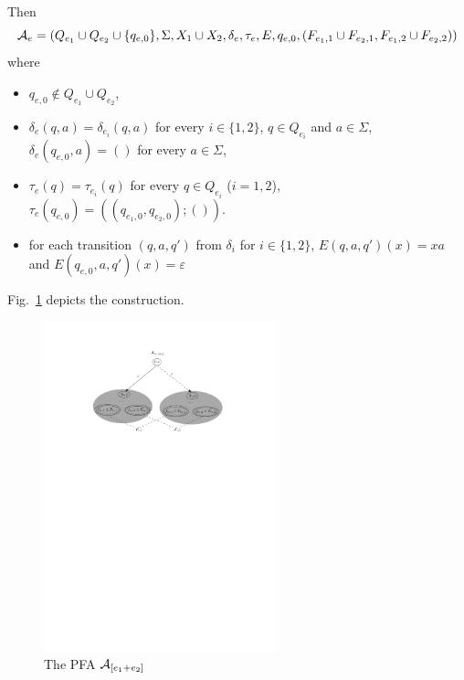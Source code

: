 Then 
\[\mathcal{A}_e = (Q_{e_1} \cup Q_{e_2} \cup \{q_{e,0}\}, \Sigma, X_1\cup X_2, 
		\delta_e, \tau_e, E, q_{e,0}, (F_{e_1,1} \cup F_{e_2,1}, F_{e_1,2} \cup F_{e_2,2}))\] where  
		\begin{itemize}
			\item $q_{e,0}  \not \in Q_{e_1} \cup Q_{e_2}$, 
			\item $\delta_e(q, a) = \delta_{e_i}(q, a)$ for every $i \in \{1,2\}$, $q \in Q_{e_i}$ and $a \in \Sigma$, 
			$\delta_e(q_{e,0}, a)  = ()$ for every $a \in \Sigma$, 
			\item $\tau_e(q) = \tau_{e_i}(q)$ for every $q \in Q_{e_i}$ ($i =1,2$), $\tau_e(q_{e,0}) = ((q_{e_1,0},q_{e_2,0}); ())$.
			\item for each transition $(q, a, q')$ from $\delta_i$ for $i\in\{1,2\}$, $E(q,a,q')(x) =xa$ and $E(q_{e,0},a,q')(x) =\varepsilon$
		\end{itemize}
Fig.~\ref{fig-reg2pfa-1} depicts the construction.  	
		\begin{figure}[ht]
			\centering
			\includegraphics[width = 0.6\textwidth]{reg2pfa-1.pdf}
			\caption{The PFA $\mathcal{A}_{[e_1+e_2]}$}
			\label{fig-reg2pfa-1}
		\end{figure}  


